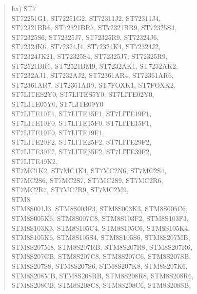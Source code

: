 \documentclass[12pt,twoside]{report}
\begin{document}
\begin{quote}
ba) ST7 \\
    ST72251G1, ST72251G2, ST72311J2, ST72311J4, \\
    ST72321BR6, ST72321BR7, ST72321BR9, ST72325S4, \\
    ST72325S6, ST72325J7, ST72325R9, ST72324J6, \\
    ST72324K6, ST72324J4, ST72324K4, ST72324J2, \\
    ST72324JK21, ST72325S4, ST72325J7, ST72325R9, \\
    ST72521BR6, ST72521BM9, ST7232AK1, ST7232AK2, \\
    ST7232AJ1, ST7232AJ2, ST72361AR4, ST72361AR6, \\
    ST72361AR7, ST72361AR9, ST7FOXK1, ST7FOXK2, \\
    ST7LITES2Y0, ST7LITES5Y0, ST7LITE02Y0, \\
    ST7LITE05Y0, ST7LITE09Y0 \\
    ST7LITE10F1, ST7LITE15F1, ST7LITE19F1, \\
    ST7LITE10F0, ST7LITE15F0, ST7LITE15F1, \\
    ST7LITE19F0, ST7LITE19F1, \\
    ST7LITE20F2, ST7LITE25F2, ST7LITE29F2, \\
    ST7LITE30F2, ST7LITE35F2, ST7LITE39F2, \\
    ST7LITE49K2, \\
    ST7MC1K2, ST7MC1K4, ST7MC2N6, ST7MC2S4, \\
    ST7MC2S6, ST7MC2S7, ST7MC2S9, ST7MC2R6, \\
    ST7MC2R7, ST7MC2R9, ST7MC2M9, \\
    STM8 \\
    STM8S001J3, STM8S003F3, STM8S003K3, STM8S005C6,\\
    STM8S005K6, STM8S007C8, STM8S103F2, STM8S103F3,\\
    STM8S103K3, STM8S105C4, STM8S105C6, STM8S105K4,\\
    STM8S105K6, STM8S105S4, STM8S105S6, STM8S207MB,\\
    STM8S207M8, STM8S207RB, STM8S207R8, STM8S207R6,\\
    STM8S207CB, STM8S207C8, STM8S207C6, STM8S207SB,\\
    STM8S207S8, STM8S207S6, STM8S207K8, STM8S207K6,\\
    STM8S208MB, STM8S208RB, STM8S208R8, STM8S208R6,\\
    STM8S208CB, STM8S208C8, STM8S208C6, STM8S208SB,\\

\end{quote}
\end{document}
